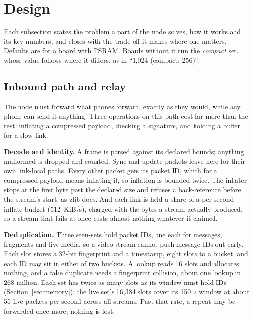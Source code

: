 \documentclass[conference]{IEEEtran}
\begin{document}
\section{Design}
\label{sec:design}

Each subsection states the problem a part of the node solves, how it works and its key numbers, and closes with the trade-off it makes where one matters. Defaults are for a board with PSRAM. Boards without it run the \emph{compact} set, whose value follows where it differs, as in ``1,024 (compact: 256)''.

\subsection{Inbound path and relay}
\label{sec:relay}

The node must forward what phones forward, exactly as they would, while any phone can send it anything. Three operations on this path cost far more than the rest: inflating a compressed payload, checking a signature, and holding a buffer for a slow link.

\textbf{Decode and identity.} A frame is parsed against its declared bounds; anything malformed is dropped and counted. Sync and update packets leave here for their own link-local paths. Every other packet gets its packet ID, which for a compressed payload means inflating it, so inflation is bounded twice. The inflater stops at the first byte past the declared size and refuses a back-reference before the stream's start, as zlib does. And each link is held a share of a per-second inflate budget (512~KiB/s), charged with the bytes a stream actually produced, so a stream that fails at once costs almost nothing whatever it claimed.

\textbf{Deduplication.} Three seen-sets hold packet IDs, one each for messages, fragments and live media, so a video stream cannot push message IDs out early. Each slot stores a 32-bit fingerprint and a timestamp, eight slots to a bucket, and each ID may sit in either of two buckets. A lookup reads 16 slots and allocates nothing, and a false duplicate needs a fingerprint collision, about one lookup in 268 million. Each set has twice as many slots as its window must hold IDs (Section~\ref{sec:memory}): the live set's 16{,}384 slots cover its 150~s window at about 55 live packets per second across all streams. Past that rate, a repeat may be forwarded once more; nothing is lost.
\end{document}
